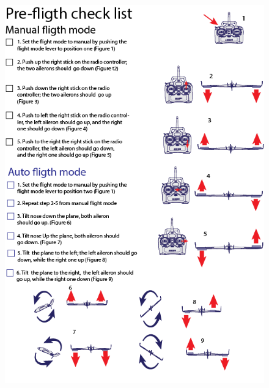 \section{}
\label{Appendix:Check}
\begin{figure}[H]
\centering
\includegraphics[scale=0.68]{imagenes/pre-fligthCheck.png}

\end{figure}
